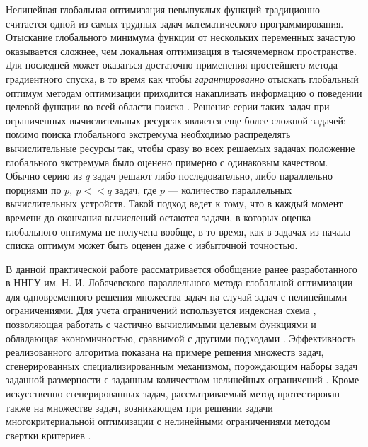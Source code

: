 Нелинейная глобальная оптимизация невыпуклых функций традиционно считается одной из самых трудных
задач математического программирования. Отыскание глобального минимума функции от нескольких переменных
зачастую оказывается сложнее, чем локальная оптимизация в тысячемерном пространстве. Для последней может оказаться достаточно
применения простейшего метода градиентного спуска, в то время как чтобы \textit{гарантированно} отыскать глобальный оптимум методам
оптимизации приходится накапливать информацию о поведении целевой функции во всей области поиска \cite{Jones2009,Paulavicius2011,Evtushenko2013,Strongin2000}. Решение серии таких задач при ограниченных вычислительных
ресурсах является еще более сложной задачей: помимо поиска глобального экстремума необходимо
распределять вычислительные ресурсы так, чтобы сразу во всех решаемых задачах положение глобального
экстремума было оценено примерно с одинаковым качеством. Обычно серию из \(q\) задач решают либо последовательно, либо
параллельно порциями по \(p,\:p<<q\) задач, где \(p\) --- количество параллельных вычислительных устройств.
Такой подход ведет к тому, что в каждый момент времени до окончания вычислений
остаются задачи, в которых оценка глобального оптимума не получена вообще, в то время, как в задачах из начала
списка оптимум может быть оценен даже с избыточной точностью.

В данной практической работе рассматривается обобщение ранее разработанного в ННГУ им. Н. И. Лобачевского
параллельного метода глобальной оптимизации для одновременного решения множества задач \cite{BarkalovStrongin2018} на
случай задач с нелинейными ограничениями. Для учета ограничений используется индексная схема \cite{Strongin2000},
позволяющая работать с частично вычислимыми целевым функциями и обладающая экономичностью,
сравнимой с другими подходами \cite{BarkalovLebedev2017}. Эффективность реализованного
алгоритма показана на примере решения множеств задач, сгенерированных специализированным
механизмом, порождающим наборы задач заданной размерности с заданным количеством нелинейных ограничений \cite{GergelBarkalov2019}.
Кроме искусственно сгенерированных задач, рассматриваемый метод протестирован также
на множестве задач, возникающем при решении задачи многокритериальной оптимизации
с нелинейными ограничениями методом свертки критериев \cite{Ehrgott2005}.
